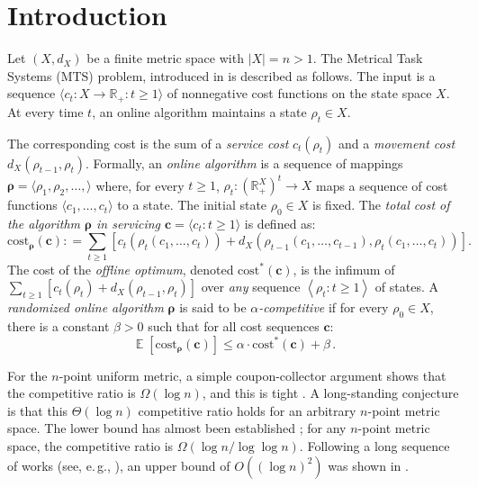 \documentclass[11pt]{article}
\numberwithin{equation}{section}
\theoremstyle{definition}
\theoremstyle{plain}
\newcommand{\R}{\mathbb R}
\newcommand{\eg}{e.\,g.}
\newcommand{\cost}{\mathrm{cost}}
\newcommand{\seteq}{\mathrel{\mathop:}=}
\newcommand{\llangle}{\left\langle}
\newcommand{\rrangle}{\right\rangle}
\DeclareMathOperator*{\Exp}{\mathbb{E}}
\begin{document}
%
%
%



\section{Introduction}

Let $(X,d_X)$ be a finite metric space with $|X|=n > 1$. The Metrical Task
Systems (MTS) problem, introduced in \cite{BLS92} is described as follows.
The input is a sequence $\langle c_t : X \rightarrow \R_+ : t \geq 1\rangle$ of
nonnegative cost functions on the state space $X$.
At every time $t$, an online algorithm maintains
a state $\rho_t \in X$.

The corresponding cost is the sum of a \emph{service cost} $c_t(\rho_t)$ and a
\emph{movement cost} $d_X(\rho_{t-1}, \rho_t)$.
Formally, an \emph{online algorithm} is a sequence of mappings
$\bm{\rho} = \langle \rho_1, \rho_2, \ldots, \rangle$
where, for every $t \geq 1$,
$\rho_t : (\R_+^X)^t \to X$ maps a sequence of cost functions $\langle c_1, \ldots, c_t\rangle$
to a state. The initial state $\rho_0 \in X$ is fixed. The \emph{total cost of the algorithm $\bm{\rho}$ in servicing $\bm{c} = \langle c_t : t \geq 1\rangle$} is defined as:
\[
\cost_{\bm{\rho}}(\bm{c}) \seteq \sum_{t \geq 1} \left[c_t\!\left(\rho_t(c_1,\ldots, c_t)\right) + d_X\!\left(\rho_{t-1}(c_1,\ldots, c_{t-1}), \rho_t(c_1,\ldots, c_t)\right)\right].
\]
The cost of the \emph{offline optimum}, denoted $\cost^*(\bm{c})$, is the infimum of
$\sum_{t \geq 1} [c_t(\rho_t)+d_X(\rho_{t-1},\rho_t)]$ over \emph{any} sequence
$\llangle \rho_t : t \geq 1\rrangle$ of states.
A \emph{randomized online algorithm} $\bm{\rho}$  is said to be \emph{$\alpha$-competitive}
if for every $\rho_0 \in X$, there is a constant $\beta > 0$ such that for all
cost sequences $\bm{c}$:
\[
\Exp\left[\cost_{\bm{\rho}}(\bm{c})\right] \leq \alpha \cdot \cost^*(\bm{c}) + \beta\,.
\]

For the $n$-point uniform metric,
a simple coupon-collector argument shows that the competitive ratio is $\Omega(\log n)$, and this is tight \cite{BLS92}. A long-standing conjecture is that this $\Theta(\log n)$ competitive ratio holds for an arbitrary $n$-point metric space.
The lower bound has almost been established \cite{BBM06,BLMN05};
for any $n$-point metric space, the competitive ratio is $\Omega(\log n / \log \log n)$.
Following a long sequence of works (see, \eg, \cite{Sei99,BKRS00,BBBT97,Bar96,FM03,FRT04}),
an upper bound of $O((\log n)^2)$ was shown in \cite{BCLL19}.
\end{document}
